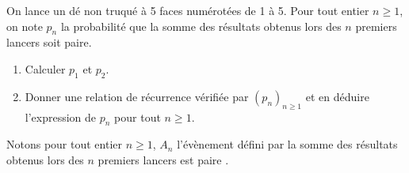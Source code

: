 \documentclass[a4paper,10pt]{report}
\begin{document}
\begin{Exa} On lance un dé non truqué à 5 faces numérotées de 1 à 5. Pour tout entier $n \geq 1$, on note $p_n$ la probabilité que la somme des résultats obtenus lors des $n$ premiers lancers soit paire. 
\begin{enumerate}
\item Calculer $p_1$ et $p_2$.
\item Donner une relation de récurrence vérifiée par $(p_n)_{n \geq 1}$ et en déduire l'expression de $p_n$ pour tout $n \geq 1$.
\end{enumerate}
\end{Exa}

\corr Notons pour tout entier $n \geq 1$, $A_n$ l'évènement défini par \og la somme des résultats obtenus lors des $n$ premiers lancers est paire \fg .
\end{document}

